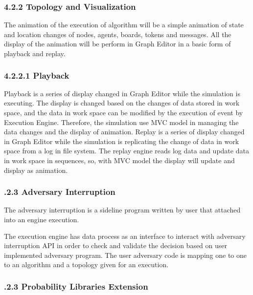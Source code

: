 \subsubsection{4.2.2 Topology and Visualization }

The animation of the execution of algorithm will be a simple animation of state and location changes of nodes, agents, boards, tokens and messages. All the display of the animation will be perform in Graph Editor in a basic form of playback and replay.



\subsubsection{4.2.2.1 Playback}
Playback is a series of display changed in Graph Editor while the simulation is executing. The display is changed based on the changes of data stored in work space, and the data in work space can be modified by the execution of event by Execution Engine. Therefore, the simulation use MVC model in managing the data changes and the display of animation.
Replay is a series of display changed in Graph Editor while the simulation is replicating the change of data in work space from a log in file system. The replay engine reads log data and update data in work space in sequences, so, with MVC model the display will update and display as animation.


\subsubsection{.2.3 Adversary Interruption}

The adversary interruption is a sideline program written by user that attached into an engine execution.



The execution engine has data process as an interface to interact with adversary interruption API in order to check and validate the decision based on user implemented adversary program. The user adversary code is mapping one to one to an algorithm and a topology given for an execution.

\subsubsection{.2.3 Probability Libraries Extension}

